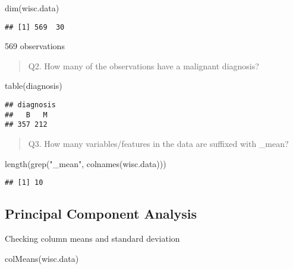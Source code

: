\documentclass[
]{article}
\newenvironment{Shaded}{\begin{snugshade}}{\end{snugshade}}
\newcommand{\FunctionTok}[1]{\textcolor[rgb]{0.00,0.00,0.00}{#1}}
\newcommand{\NormalTok}[1]{#1}
\newcommand{\StringTok}[1]{\textcolor[rgb]{0.31,0.60,0.02}{#1}}
\begin{document}
\begin{Shaded}
\begin{Highlighting}[]
\FunctionTok{dim}\NormalTok{(wisc.data)}
\end{Highlighting}
\end{Shaded}

\begin{verbatim}
## [1] 569  30
\end{verbatim}

569 observations

\begin{quote}
Q2. How many of the observations have a malignant diagnosis?
\end{quote}

\begin{Shaded}
\begin{Highlighting}[]
\FunctionTok{table}\NormalTok{(diagnosis)}
\end{Highlighting}
\end{Shaded}

\begin{verbatim}
## diagnosis
##   B   M 
## 357 212
\end{verbatim}

\begin{quote}
Q3. How many variables/features in the data are suffixed with \_mean?
\end{quote}

\begin{Shaded}
\begin{Highlighting}[]
\FunctionTok{length}\NormalTok{(}\FunctionTok{grep}\NormalTok{(}\StringTok{"\_mean"}\NormalTok{, }\FunctionTok{colnames}\NormalTok{(wisc.data)))}
\end{Highlighting}
\end{Shaded}

\begin{verbatim}
## [1] 10
\end{verbatim}

\hypertarget{principal-component-analysis}{%
\subsection{Principal Component
Analysis}\label{principal-component-analysis}}

Checking column means and standard deviation

\begin{Shaded}
\begin{Highlighting}[]
\FunctionTok{colMeans}\NormalTok{(wisc.data)}
\end{Highlighting}
\end{Shaded}
\end{document}
